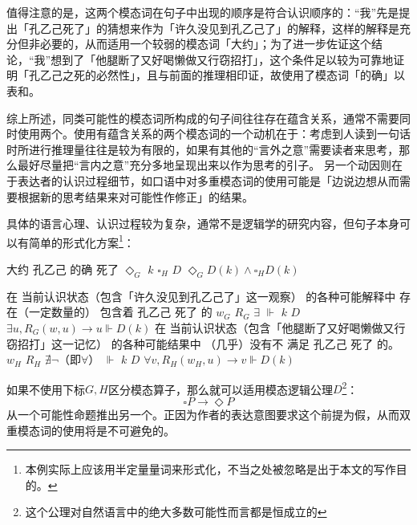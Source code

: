 \documentclass[fontset=ubuntu]{ctexart}
\newcommand{\textul}[1]{\makebox{\underline{#1}}}
\begin{document}
				值得注意的是，这两个模态词在句子中出现的顺序是符合认识顺序的：“我”先是提出「孔乙己死了」的猜想来作为「许久没见到孔乙己了」的解释，这样的解释是充分但非必要的，从而适用一个较弱的模态词「大约」；为了进一步佐证这个结论，“我”想到了「他腿断了又好喝懒做又行窃招打」，这个条件足以较为可靠地证明「孔乙己之死的必然性」，且与前面的推理相印证，故使用了模态词「的确」以表\textul{高可能性}和\textul{确认}。

				综上所述，同类可能性的模态词所构成的句子间往往存在蕴含关系，通常不需要同时使用两个。使用有蕴含关系的两个模态词的一个动机在于：考虑到人读到一句话时所进行推理量往往是较为有限的，如果有其他的“言外之意”需要读者来思考，那么最好尽量把“言内之意”充分多地呈现出来以作为思考的引子。
				另一个动因则在于表达者的认识过程细节，如口语中对多重模态词的使用可能是「边说边想从而需要根据新的思考结果来对可能性作修正」的结果。

				具体的语言心理、认识过程较为复杂，通常不是逻辑学的研究内容，但句子本身可以有简单的形式化方案\footnote{本例实际上应该用半定量量词来形式化，不当之处被忽略是出于本文的写作目的。}：

				\begin{covexamples}
					\item 
						\gll 大约 孔乙己 的确 死了
							\(\Diamond_G\) \(k\) \(\square_H\) \(D\)
						\glt \(\Diamond_G D(k)\land\square_H D(k)\)
						\glend
					\item 
						\gll 在 当前认识状态（包含「许久没见到孔乙己了」这一观察） 的各种可能解释中 存在（一定数量的） 包含着 孔乙己 死了 的
							{} \(w_G\) \(R_G\) \(\exists\) \(\Vdash\) \(k\) \(D\) {}
						\glt \(\exists u,R_G(w,u)\to u\Vdash D(k)\)
						\glend
						\gll 在 当前认识状态（包含「他腿断了又好喝懒做又行窃招打」这一记忆） 的各种可能结果中 （几乎）没有不 满足 孔乙己 死了 的。
							{} \(w_H\) \(R_H\) \(\nexists\lnot\)（即\(\forall\)） \(\Vdash\) \(k\) \(D\) {}
						\glt \(\forall v,R_H(w_H,u)\to v\Vdash D(k)\)
						\glend
						
				\end{covexamples}

				如果不使用下标\(G,H\)区分模态算子，那么就可以适用模态逻辑公理\(D\)\footnote{这个公理对自然语言中的绝大多数可能性而言都是恒成立的}：
				\begin{equation}
					\square P\to\Diamond P
				\end{equation}
				从一个可能性命题推出另一个。正因为作者的表达意图要求这个前提为假，从而双重模态词的使用将是不可避免的。
\end{document}
